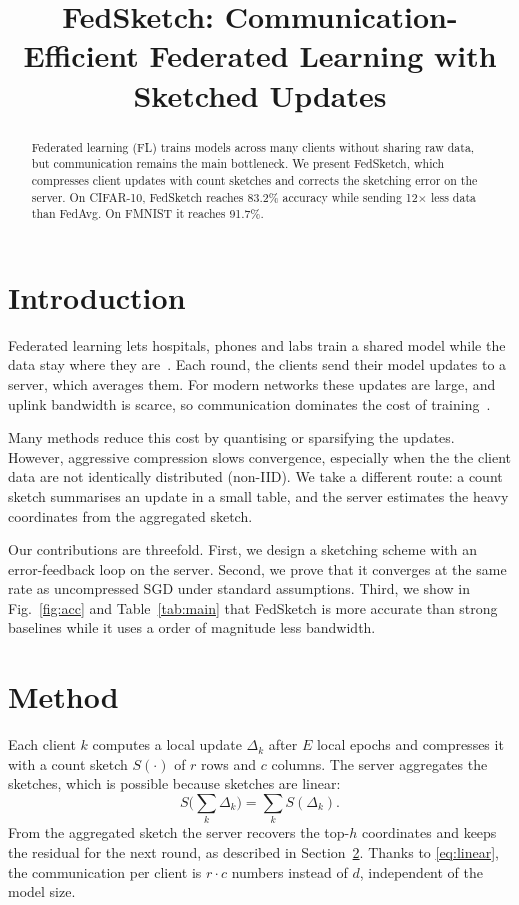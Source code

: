 \documentclass[conference]{IEEEtran}
\newcommand{\ours}{FedSketch}
\begin{document}
\title{\ours: Communication-Efficient Federated Learning with Sketched Updates}
\author{}
\maketitle

\begin{abstract}
Federated learning (FL) trains models across many clients without sharing raw data, but communication remains the main bottleneck. We present \ours, which compresses client updates with count sketches and corrects the sketching error on the server. On CIFAR-10, \ours{} reaches 83.2\% accuracy while sending 12$\times$ less data than FedAvg. On FMNIST it reaches 91.7\%.
\end{abstract}

\section{Introduction}
Federated learning lets hospitals, phones and labs train a shared model while the data stay where they are~\cite{mcmahan2017}. Each round, the clients send their model updates to a server, which averages them. For modern networks these updates are large, and uplink bandwidth is scarce, so communication dominates the cost of training~\cite{li2020}.

Many methods reduce this cost by quantising or sparsifying the updates. However, aggressive compression slows convergence, especially when the the client data are not identically distributed (non-IID). We take a different route: a count sketch summarises an update in a small table, and the server estimates the heavy coordinates from the aggregated sketch.

Our contributions are threefold. First, we design a sketching scheme with an error-feedback loop on the server. Second, we prove that it converges at the same rate as uncompressed SGD under standard assumptions. Third, we show in Fig.~\ref{fig:acc} and Table~\ref{tab:main} that \ours{} is more accurate than strong baselines while it uses a order of magnitude less bandwidth.

\section{Method}
\label{sec:method}
Each client $k$ computes a local update $\Delta_k$ after $E$ local epochs and compresses it with a count sketch $S(\cdot)$ of $r$ rows and $c$ columns. The server aggregates the sketches, which is possible because sketches are linear:
\begin{equation}
S\Big(\sum_k \Delta_k\Big) = \sum_k S(\Delta_k).
\label{eq:linear}
\end{equation}
From the aggregated sketch the server recovers the top-$h$ coordinates and keeps the residual for the next round, as described in Section~\ref{sec:method}. Thanks to \eqref{eq:linear}, the communication per client is $r \cdot c$ numbers instead of $d$, independent of the model size.
\end{document}
